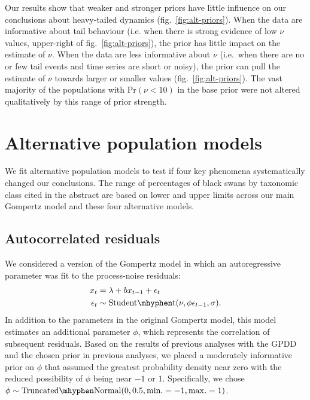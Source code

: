 \documentclass[12pt]{article}
\begin{document}
Our results show that weaker and stronger priors have little influence on our conclusions about heavy-tailed dynamics (fig.~\ref{fig:alt-priors}). When the data are informative about tail behaviour (i.e. when there is strong evidence of low \(\nu\) values, upper-right of fig.~\ref{fig:alt-priors}), the prior has little impact on the estimate of \(\nu\). When the data are less informative about \(\nu\) (i.e.\ when there are no or few tail events and time series are short or noisy), the prior can pull the estimate of \(\nu\) towards larger or smaller values (fig.~\ref{fig:alt-priors}). The vast majority of the populations with Pr\((\nu < 10)\) in the base prior were not altered qualitatively by this range of prior strength.

\section{Alternative population models} We fit alternative population models to test if four key phenomena systematically changed our conclusions. The range of percentages of black swans by taxonomic class cited in the abstract are based on lower and upper limits across our main Gompertz model and these four alternative models.

\subsection{Autocorrelated residuals} We considered a version of the Gompertz model in which an autoregressive parameter was fit to the process-noise residuals:
\begin{align}
x_t &= \lambda + b x_{t-1} + \epsilon_t\\
\epsilon_t &\sim \mathrm{Student\mhyphen t}(\nu, \phi \epsilon_{t-1}, \sigma).
\end{align}
In addition to the parameters in the original Gompertz model, this model estimates an additional parameter \(\phi\), which represents the correlation of subsequent residuals. Based on the results of previous analyses with the GPDD\cite{connors2014} and the chosen prior in previous analyses\cite{thorson2014a}, we placed a moderately informative prior on \(\phi\) that assumed the greatest probability density near zero with the reduced possibility of \(\phi\) being near \(-1\) or \(1\). Specifically, we chose \(\phi \sim \mathrm{Truncated\mhyphen Normal}(0, 0.5, \mathrm{min.} = -1, \mathrm{max.} = 1)\).
\end{document}
